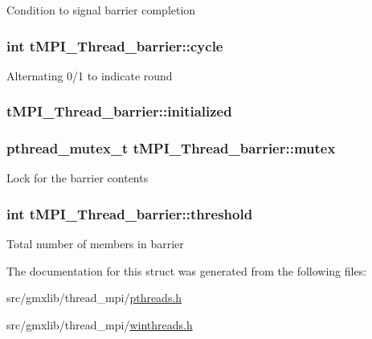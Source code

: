\-Condition to signal barrier completion \hypertarget{structtMPI__Thread__barrier_a40a3ce799420fdf21e5efadd5f035f84}{
\subsubsection[{cycle}]{\setlength{\rightskip}{0pt plus 5cm}int {\bf t\-M\-P\-I\-\_\-\-Thread\-\_\-barrier\-::cycle}}}\label{structtMPI__Thread__barrier_a40a3ce799420fdf21e5efadd5f035f84}
\-Alternating 0/1 to indicate round \hypertarget{structtMPI__Thread__barrier_a312e78b6d376c05247b52d3689c53144}{
\subsubsection[{initialized}]{ {\bf t\-M\-P\-I\-\_\-\-Thread\-\_\-barrier\-::initialized}}}\label{structtMPI__Thread__barrier_a312e78b6d376c05247b52d3689c53144}
\hypertarget{structtMPI__Thread__barrier_a58cb4561b37cc6e66d18e308e15eab36}{
\subsubsection[{mutex}]{\setlength{\rightskip}{0pt plus 5cm}pthread\-\_\-mutex\-\_\-t {\bf t\-M\-P\-I\-\_\-\-Thread\-\_\-barrier\-::mutex}}}\label{structtMPI__Thread__barrier_a58cb4561b37cc6e66d18e308e15eab36}
\-Lock for the barrier contents \hypertarget{structtMPI__Thread__barrier_afd7dba8362370830114a00e04f1d6897}{
\subsubsection[{threshold}]{\setlength{\rightskip}{0pt plus 5cm}int {\bf t\-M\-P\-I\-\_\-\-Thread\-\_\-barrier\-::threshold}}}\label{structtMPI__Thread__barrier_afd7dba8362370830114a00e04f1d6897}
\-Total number of members in barrier 

\-The documentation for this struct was generated from the following files\-:\begin{DoxyCompactItemize}
\item 
src/gmxlib/thread\-\_\-mpi/\hyperlink{pthreads_8h}{pthreads.\-h}\item 
src/gmxlib/thread\-\_\-mpi/\hyperlink{winthreads_8h}{winthreads.\-h}\end{DoxyCompactItemize}
